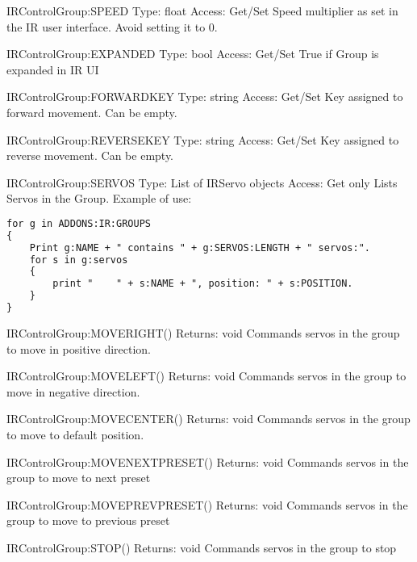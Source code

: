 IRControlGroup:SPEED
Type:	float
Access:	Get/Set
Speed multiplier as set in the IR user interface. Avoid setting it to 0.

IRControlGroup:EXPANDED
Type:	bool
Access:	Get/Set
True if Group is expanded in IR UI

IRControlGroup:FORWARDKEY
Type:	string
Access:	Get/Set
Key assigned to forward movement. Can be empty.

IRControlGroup:REVERSEKEY
Type:	string
Access:	Get/Set
Key assigned to reverse movement. Can be empty.

IRControlGroup:SERVOS
Type:	List of IRServo objects
Access:	Get only
Lists Servos in the Group. Example of use:

\begin{lstlisting}[frame=single,language=XML]
for g in ADDONS:IR:GROUPS
{
    Print g:NAME + " contains " + g:SERVOS:LENGTH + " servos:".
    for s in g:servos
    {
        print "    " + s:NAME + ", position: " + s:POSITION.
    }
}
\end{lstlisting}

IRControlGroup:MOVERIGHT()
Returns:	void
Commands servos in the group to move in positive direction.

IRControlGroup:MOVELEFT()
Returns:	void
Commands servos in the group to move in negative direction.

IRControlGroup:MOVECENTER()
Returns:	void
Commands servos in the group to move to default position.

IRControlGroup:MOVENEXTPRESET()
Returns:	void
Commands servos in the group to move to next preset

IRControlGroup:MOVEPREVPRESET()
Returns:	void
Commands servos in the group to move to previous preset

IRControlGroup:STOP()
Returns:	void
Commands servos in the group to stop

